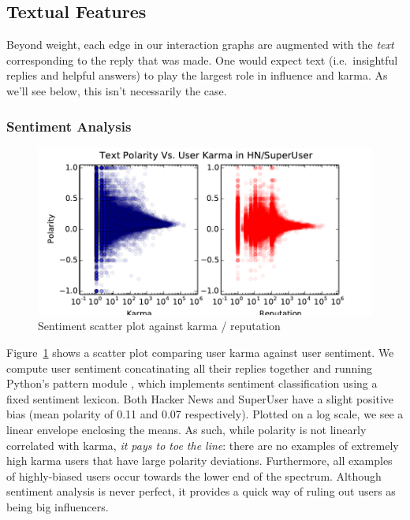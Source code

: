 \documentclass[11pt]{article}
\begin{document}

\subsection{Textual Features}
Beyond weight, each edge in our interaction graphs are augmented with the
\textit{text} corresponding to the reply that was made. One would expect 
text (i.e.\ insightful replies and helpful answers) to play the largest role 
in influence and karma. As we'll see below, this isn't necessarily the case.

\subsubsection{Sentiment Analysis}
\label{sec:sentiment}
\begin{figure}[h]
\centering
\includegraphics[width=\linewidth]{text_polarity}
\caption{Sentiment scatter plot against karma / reputation}
\label{fig:sentiment}
\end{figure}

Figure~\ref{fig:sentiment} shows a scatter plot comparing user karma
against user sentiment. We compute user sentiment concatinating all
their replies together and running Python's pattern module \citet{de2012pattern}, 
which implements sentiment classification using a fixed sentiment lexicon.  Both
Hacker News and SuperUser have a slight positive bias (mean polarity of 0.11 and
0.07 respectively). Plotted on a log scale, we see a linear envelope enclosing
the means. As such, while polarity is not linearly correlated with karma,
\textit{it pays to toe the line}: there are no examples of extremely high karma
users that have large polarity deviations. Furthermore, all examples of
highly-biased users occur towards the lower end of the spectrum. Although
sentiment analysis is never perfect, it provides a quick way of ruling out users
as being big influencers.
\end{document}
